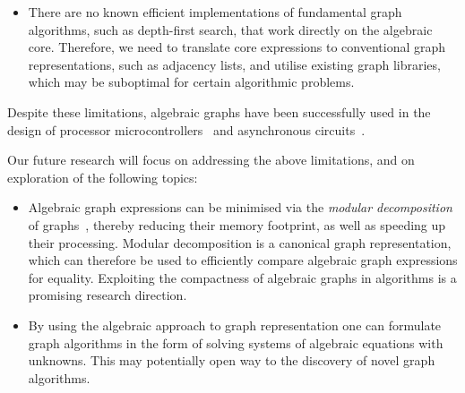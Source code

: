 \begin{itemize}
    \item There are no known efficient implementations of fundamental graph
    algorithms, such as depth-first search, that work directly on the algebraic
    core. Therefore, we need to translate core expressions to conventional
    graph representations, such as adjacency lists, and utilise existing graph
    libraries, which may be suboptimal for certain algorithmic problems.
\end{itemize}

Despite these limitations, algebraic graphs have been successfully used
in the design of processor microcontrollers~\cite{2014_algebra_mokhov} and
asynchronous circuits~\cite{2015_beaumont_concepts}.

Our future research will focus on addressing the above limitations, and on
exploration of the following topics:

\begin{itemize}
    \item Algebraic graph expressions can be minimised via the
    \emph{modular decomposition} of graphs~\cite{2005_mcconnell_modular}, thereby
    reducing their memory footprint, as well as speeding up their processing.
    Modular decomposition is a canonical graph representation, which can therefore
    be used to efficiently compare algebraic graph expressions for equality.
    Exploiting the compactness of algebraic graphs in algorithms is a
    promising research direction.
    \item By using the algebraic approach to graph representation one can
    formulate graph algorithms in the form of solving systems of algebraic
    equations with unknowns.
    This may potentially open way to the discovery of novel graph algorithms.
\end{itemize}

\newpage
